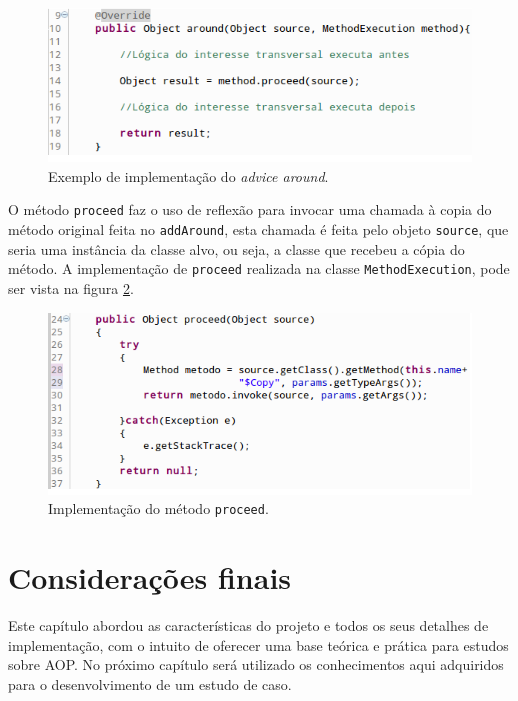 \documentclass[tc,oneside]{iiufrgs}
\begin{document}
\begin{figure}[ht]
	\centering
	\includegraphics[scale=0.5]{figuras/implementacao/exemplo_proceed.png}
	\caption{Exemplo de implementação do \textit{advice around}.}
	\label{fig:exemploproceed}
\end{figure}

O método \texttt{proceed} faz o uso de reflexão para invocar uma chamada à copia do método original feita no \texttt{addAround}, esta chamada é feita pelo objeto \texttt{source}, que seria uma instância da classe alvo, ou seja, a classe que recebeu a cópia do método. A implementação de \texttt{proceed} realizada na classe \texttt{MethodExecution}, pode ser vista na figura \ref{fig:proceed}. 

\begin{figure}[ht]
	\centering
	\includegraphics[scale=0.5]{figuras/implementacao/proceed.png}
	\caption{Implementação do método \texttt{proceed}.}
	\label{fig:proceed}
\end{figure}

\section{Considerações finais}

Este capítulo abordou as características do projeto e todos os seus detalhes de implementação, com o intuito de oferecer uma base teórica e prática para estudos sobre AOP. No próximo capítulo será utilizado os conhecimentos aqui adquiridos para o desenvolvimento de um estudo de caso.
\end{document}
